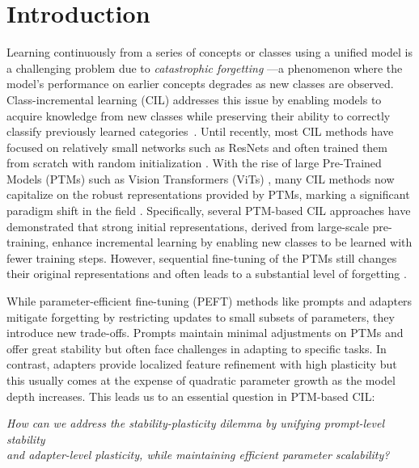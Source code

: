 \section{Introduction} 
\label{sec:intro}
Learning continuously from a series of concepts or classes using a unified model is a challenging problem due to \textit{catastrophic forgetting} \cite{catastrophic}—a phenomenon where the model’s performance on earlier concepts degrades as new classes are observed. Class-incremental learning (CIL) addresses this issue by enabling models to acquire knowledge from new classes while preserving their ability to correctly classify previously learned categories~\cite{masana_survey}. Until recently, most CIL methods have focused on relatively small networks such as ResNets \cite{resnet} and often trained them from scratch with random initialization \cite{deepcil_survey, defyingforget_survey}.
With the rise of large Pre-Trained Models (PTMs) \cite{swin, convit, clip} such as Vision Transformers (ViTs) \cite{vit}, many CIL methods now capitalize on the robust representations provided by PTMs, marking a significant paradigm shift in the field \cite{sprompt, nmc, l2p, dualprompt, codaprompt, simplecil_aper, ease, mos}. Specifically, several PTM-based CIL approaches \cite{ptm_effect1, ptm_effect2, ptm_effect3} have demonstrated that strong initial representations, derived from large-scale pre-training, enhance incremental learning by enabling new classes to be learned with fewer training steps. However, sequential fine-tuning of the PTMs still changes their original representations and often leads to a substantial level of forgetting \cite{ranpac, film, slca}.

While parameter-efficient fine-tuning (PEFT) methods like prompts and adapters mitigate forgetting by restricting updates to small subsets of parameters, they introduce new trade-offs. Prompts maintain minimal adjustments on PTMs and offer great stability but often face challenges in adapting to specific tasks. In contrast, adapters provide localized feature refinement with high plasticity but this usually comes at the expense of quadratic parameter growth as the model depth increases.
This leads us to an essential question in PTM-based CIL:

\begin{center}
\colorbox{gray!15}{ %
\parbox{0.97\textwidth}{
\centering
\vspace{2mm}
\textit{How can we address the stability-plasticity dilemma \cite{stability_plasticity} by unifying prompt-level stability \\ and adapter-level plasticity, while maintaining efficient parameter scalability?}
\vspace{2mm}
}
}
\end{center}

